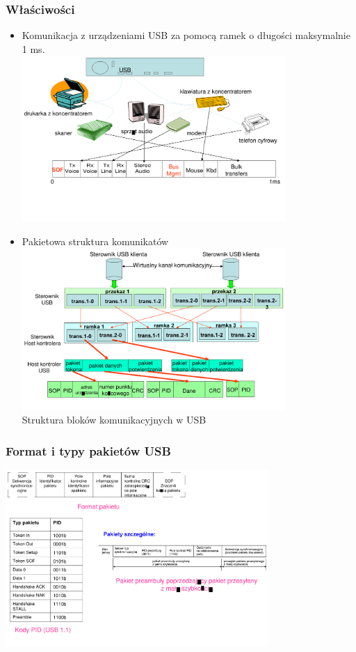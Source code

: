 	\subsubsection{Właściwości}
	\begin{itemize}
		\item Komunikacja z urządzeniami USB za pomocą ramek o długości maksymalnie 1 ms.\\
		\includegraphics[width=10cm]{./wyklady/USB_18_1.pdf}
		\item Pakietowa struktura komunikatów\\
		\includegraphics[width=10cm]{./wyklady/USB_19_1.pdf}\\
		Struktura bloków komunikacyjnych w USB
	\end{itemize}
	\subsubsection{Format i typy pakietów USB}
	\includegraphics[width=10cm]{./wyklady/USB_20_1.pdf}
